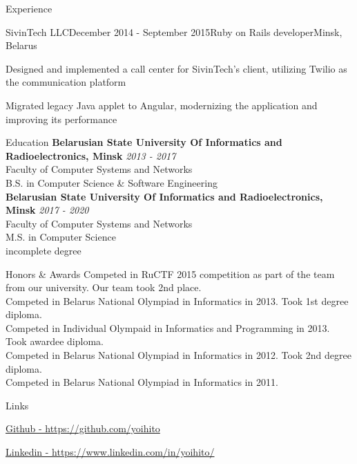 \documentclass{resume}
\begin{document}
\begin{rSection}{Experience}
    \begin{rSubsection}{SivinTech LLC}{December 2014 - September 2015}{Ruby on Rails developer}{Minsk, Belarus}
    \item Designed and implemented a call center for SivinTech's client, utilizing Twilio as the communication platform
    \item Migrated legacy Java applet to Angular, modernizing the application and improving its performance
    \end{rSubsection}
  \end{rSection}

  \begin{rSection}{Education}
    {\bf Belarusian State University Of Informatics and Radioelectronics, Minsk} \hfill {\em 2013 - 2017} \\
    { Faculty of Computer Systems and Networks } \\
    { B.S. in Computer Science \& Software Engineering } \\
    {\bf Belarusian State University Of Informatics and Radioelectronics, Minsk} \hfill {\em 2017 - 2020} \\
    { Faculty of Computer Systems and Networks } \\
    { M.S. in Computer Science } \\
    { incomplete degree } \\
  \end{rSection}

  \begin{rSection}{Honors \& Awards}
  {Competed in RuCTF 2015 competition as part of the team from our university. Our team took 2nd place.} \\
  {Competed in Belarus National Olympiad in Informatics in 2013. Took 1st degree diploma.} \\
  {Competed in Individual Olympaid in Informatics and Programming in 2013. Took awardee diploma.} \\
  {Competed in Belarus National Olympiad in Informatics in 2012. Took 2nd degree diploma.} \\
  {Competed in Belarus National Olympiad in Informatics in 2011.}
  \end{rSection}

  \begin{rSection}{Links}
  \item \href{https://github.com/yoihito}{Github - https://github.com/yoihito}
  \item \href{https://www.linkedin.com/in/yoihito/}{Linkedin - https://www.linkedin.com/in/yoihito/}
  \end{rSection}
\end{document}
